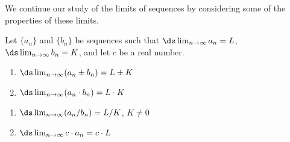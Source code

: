 We continue our study of the limits of sequences by considering some of the properties of these limits.

{Let $\{a_n\}$ and $\{b_n\}$ be sequences such that $\ds \lim_{n\to\infty} a_n = L$, $\ds \lim_{n\to\infty} b_n = K$, and let $c$ be a real number.

\begin{minipage}[t]{.5\linewidth}
\begin{enumerate}
\item		$\ds \lim_{n\to\infty} (a_n\pm b_n) = L\pm K$
\item		$\ds \lim_{n\to\infty} (a_n\cdot b_n) = L\cdot K$
\end{enumerate}
\end{minipage}
\begin{minipage}[t]{.5\linewidth}
\begin{enumerate}\addtocounter{enumi}{2}
\item		$\ds \lim_{n\to\infty} (a_n/b_n) = L/K$, $K\neq 0$
\item		$\ds \lim_{n\to\infty} c\cdot a_n = c\cdot L$
\end{enumerate}
\end{minipage}
}

